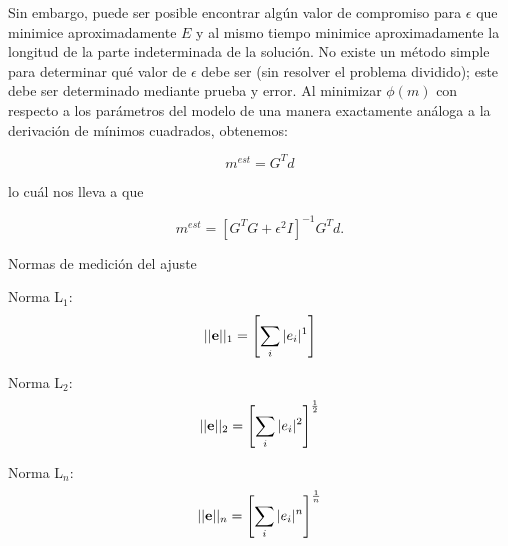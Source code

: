 \documentclass[aspectratio=169]{beamer}
\begin{document}
\begin{frame}

{\color{black}
 Sin embargo, puede ser posible encontrar algún valor de compromiso para $\epsilon$ que minimice aproximadamente $E$ y al mismo tiempo minimice aproximadamente la longitud de la parte indeterminada de la solución. No existe un método simple para determinar qué valor de $\epsilon$ debe ser (sin resolver el problema dividido); este debe ser determinado mediante prueba y error. Al minimizar $\phi(m)$ con respecto a los parámetros del modelo de una manera exactamente análoga a la derivación de mínimos cuadrados, obtenemos:

\begin{equation}
 [G^TG + \epsilon^2 I] m^{est} = G^T d
\end{equation}

lo cuál nos lleva a que

\begin{equation}
 m^{est} = [G^TG + \epsilon^2 I]^{-1} G^T d.
\end{equation}
}
 
\end{frame}


\begin{frame}
 {Normas de medición del ajuste}
 
 {
 \color{black}
 Norma L$_1$:
 \begin{equation*}
  ||\textnormal{\bf e}||_1 = \left[ \sum_i |e_i|^1 \right]
 \end{equation*}

 Norma L$_2$:
 \begin{equation*}
  ||\textnormal{\bf e}||_2 = \left[ \sum_i |e_i|^2 \right] ^{\frac{1}{2}}
 \end{equation*}
 
 Norma L$_n$:
 \begin{equation*}
  ||\textnormal{\bf e}||_n = \left[ \sum_i |e_i|^n \right] ^{\frac{1}{n}}
 \end{equation*}
}
 
\end{frame}


\begin{frame}

    
        

\end{frame}
\end{document}

